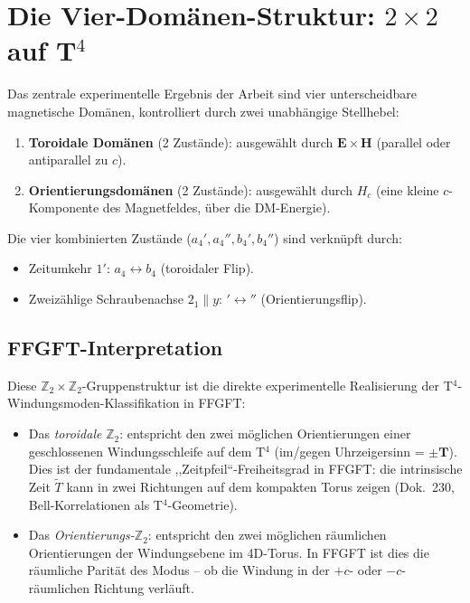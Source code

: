 \section{Die Vier-Domänen-Struktur: $2\times2$ auf T$^4$}

Das zentrale experimentelle Ergebnis der Arbeit sind vier unterscheidbare
magnetische Domänen, kontrolliert durch zwei unabhängige Stellhebel:
\begin{enumerate}
  \item \textbf{Toroidale Domänen} (2 Zustände): ausgewählt durch
        $\mathbf{E}\times\mathbf{H}$ (parallel oder antiparallel zu $c$).
  \item \textbf{Orientierungsdomänen} (2 Zustände): ausgewählt durch $H_c$
        (eine kleine $c$-Komponente des Magnetfeldes, über die DM-Energie).
\end{enumerate}

\noindent Die vier kombinierten Zustände ($a_4', a_4'', b_4', b_4''$) sind
verknüpft durch:
\begin{itemize}
  \item Zeitumkehr $1'$: $a_4 \leftrightarrow b_4$ (toroidaler Flip).
  \item Zweizählige Schraubenachse $2_1\|y$: $'\leftrightarrow''$
        (Orientierungsflip).
\end{itemize}

\subsection*{FFGFT-Interpretation}

Diese $\mathbb{Z}_2\times\mathbb{Z}_2$-Gruppenstruktur ist die direkte
experimentelle Realisierung der T$^4$-Windungsmoden-Klassifikation in FFGFT:
\begin{itemize}
  \item Das \emph{toroidale} $\mathbb{Z}_2$: entspricht den zwei möglichen
        Orientierungen einer geschlossenen Windungsschleife auf dem T$^4$
        (im/gegen Uhrzeigersinn = $\pm\mathbf{T}$). Dies ist der
        fundamentale ,,Zeitpfeil``-Freiheitsgrad in FFGFT: die intrinsische
        Zeit $\tilde{T}$ kann in zwei Richtungen auf dem kompakten Torus
        zeigen (Dok.~230, Bell-Korrelationen als T$^4$-Geometrie).
  \item Das \emph{Orientierungs-}$\mathbb{Z}_2$: entspricht den zwei
        möglichen räumlichen Orientierungen der Windungsebene im 4D-Torus.
        In FFGFT ist dies die räumliche Parität des Modus -- ob die Windung
        in der $+c$- oder $-c$-räumlichen Richtung verläuft.
\end{itemize}

